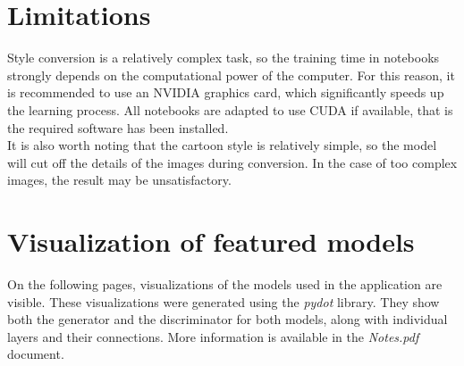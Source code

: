 \documentclass{article}
\begin{document}
\section{Limitations}
Style conversion is a relatively complex task, so the training time in notebooks strongly depends on the computational power of the computer. For this reason, it is recommended to use an NVIDIA graphics card, which significantly speeds up the learning process. All notebooks are adapted to use CUDA if available, that is the required software has been installed.
\vspace{3mm} \\
It is also worth noting that the cartoon style is relatively simple, so the model will cut off the details of the images during conversion. In the case of too complex images, the result may be unsatisfactory.

\section{Visualization of featured models}
On the following pages, visualizations of the models used in the application are visible. These visualizations were generated using the \textit{pydot} library. They show both the generator and the discriminator for both models, along with individual layers and their connections. More information is available in the \textit{Notes.pdf} document.
\newpage
\end{document}
